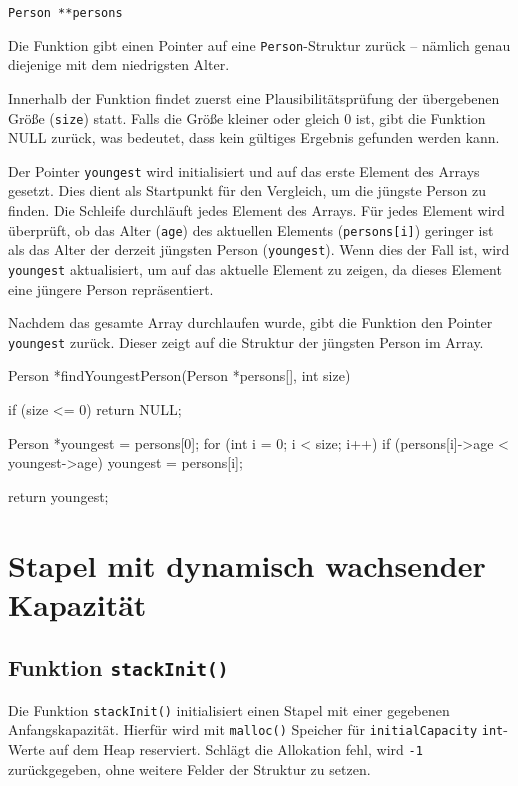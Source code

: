 \texttt{Person **persons}

Die Funktion gibt einen Pointer auf eine \texttt{Person}-Struktur zurück
-- nämlich genau diejenige mit dem niedrigsten Alter.

Innerhalb der Funktion findet zuerst eine Plausibilitätsprüfung der übergebenen
Größe (\texttt{size}) statt. Falls die Größe kleiner oder gleich 0 ist,
gibt die Funktion NULL zurück, was bedeutet, dass kein gültiges Ergebnis
gefunden werden kann.

Der Pointer \texttt{youngest} wird initialisiert und auf das erste
Element des Arrays gesetzt. Dies dient als Startpunkt für den Vergleich, um die
jüngste Person zu finden. Die Schleife durchläuft jedes Element des Arrays. Für
jedes Element wird überprüft, ob das Alter (\texttt{age}) des aktuellen
Elements (\texttt{persons[i]}) geringer ist als das Alter der derzeit
jüngsten Person (\texttt{youngest}). Wenn dies der Fall ist, wird
\texttt{youngest} aktualisiert, um auf das aktuelle Element zu zeigen, da
dieses Element eine jüngere Person repräsentiert.

Nachdem das gesamte Array durchlaufen wurde, gibt die Funktion den Pointer
\texttt{youngest} zurück. Dieser zeigt auf die Struktur der jüngsten
Person im Array.

\begin{codebox}[lang=c, fontsize=\small]
Person *findYoungestPerson(Person *persons[], int size) {
    if (size <= 0) {
        return NULL;
    }

    Person *youngest = persons[0];
    for (int i = 0; i < size; i++) {
        if (persons[i]->age < youngest->age) {
            youngest = persons[i];
        }
    }

    return youngest;
}
\end{codebox}




\chapter{Stapel mit dynamisch wachsender Kapazität}

\section*{Funktion \texttt{stackInit()}}

Die Funktion \texttt{stackInit()} initialisiert einen Stapel mit einer
gegebenen Anfangskapazität. Hierfür wird mit \texttt{malloc()}
Speicher für \texttt{initialCapacity} \texttt{int}-Werte auf
dem Heap reserviert. Schlägt die Allokation fehl, wird \texttt{-1}
zurückgegeben, ohne weitere Felder der Struktur zu setzen.

